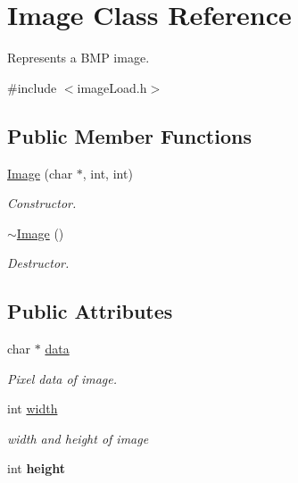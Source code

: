 \hypertarget{class_image}{\section{Image Class Reference}
\label{class_image}
}


Represents a B\-M\-P image.  




{\ttfamily \#include $<$image\-Load.\-h$>$}

\subsection*{Public Member Functions}
\begin{DoxyCompactItemize}
\item 
\hypertarget{class_image_a92262dd605ade2ed6e15876ba3c13e3a}{\hyperlink{class_image_a92262dd605ade2ed6e15876ba3c13e3a}{Image} (char $\ast$, int, int)}\label{class_image_a92262dd605ade2ed6e15876ba3c13e3a}

\begin{DoxyCompactList}\small\item\em Constructor. \end{DoxyCompactList}\item 
\hypertarget{class_image_a0294f63700543e11c0f0da85601c7ae5}{\hyperlink{class_image_a0294f63700543e11c0f0da85601c7ae5}{$\sim$\-Image} ()}\label{class_image_a0294f63700543e11c0f0da85601c7ae5}

\begin{DoxyCompactList}\small\item\em Destructor. \end{DoxyCompactList}\end{DoxyCompactItemize}
\subsection*{Public Attributes}
\begin{DoxyCompactItemize}
\item 
\hypertarget{class_image_ae67312482be4c12021201978bd709c58}{char $\ast$ \hyperlink{class_image_ae67312482be4c12021201978bd709c58}{data}}\label{class_image_ae67312482be4c12021201978bd709c58}

\begin{DoxyCompactList}\small\item\em Pixel data of image. \end{DoxyCompactList}\item 
\hypertarget{class_image_ab8d12f635013c04159cd4d3d972bac88}{int \hyperlink{class_image_ab8d12f635013c04159cd4d3d972bac88}{width}}\label{class_image_ab8d12f635013c04159cd4d3d972bac88}

\begin{DoxyCompactList}\small\item\em width and height of image \end{DoxyCompactList}\item 
\hypertarget{class_image_a51df43db420c9c0b57536cb2dd36de5c}{int {\bfseries height}}\label{class_image_a51df43db420c9c0b57536cb2dd36de5c}

\end{DoxyCompactItemize}


